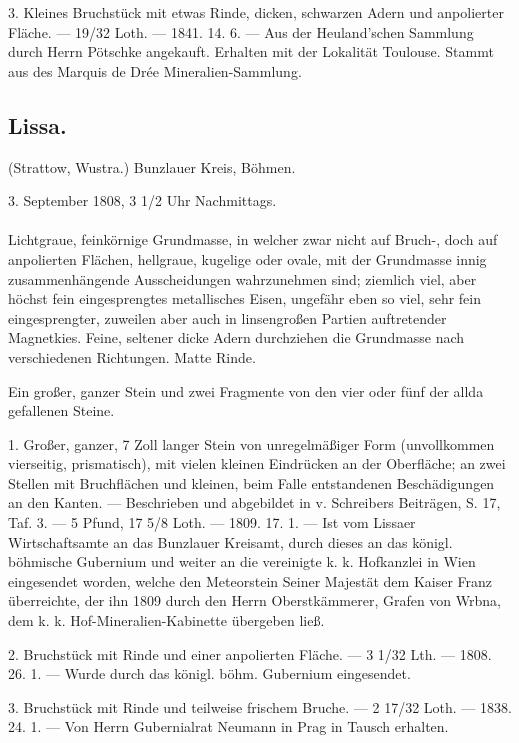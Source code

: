 \documentclass[a4paper, 11pt, oneside, polutonikogreek, german]{article}
\begin{document}
3. Kleines Bruchstück mit etwas Rinde, dicken, schwarzen Adern und anpolierter Fläche. — 19/32 Loth. — 1841. 14. 6. — Aus der Heuland'schen Sammlung durch Herrn Pötschke angekauft. Erhalten mit der Lokalität Toulouse. Stammt aus des Marquis de Drée Mineralien-Sammlung.
\subsection{Lissa.}
\begin{center}
\small
(Strattow, Wustra.) Bunzlauer Kreis, Böhmen.

3. September 1808, 3 1/2 Uhr Nachmittags.
\end{center}
\paragraph{}
Lichtgraue, feinkörnige Grundmasse, in welcher zwar nicht auf Bruch-, doch auf anpolierten Flächen, hellgraue, kugelige oder ovale, mit der Grundmasse innig zusammenhängende Ausscheidungen wahrzunehmen sind; ziemlich viel, aber höchst fein eingesprengtes metallisches Eisen, ungefähr eben so viel, sehr fein eingesprengter, zuweilen aber auch in linsengroßen Partien auftretender Magnetkies. Feine, seltener dicke Adern durchziehen die Grundmasse nach verschiedenen Richtungen. Matte Rinde.

Ein großer, ganzer Stein und zwei Fragmente von den vier oder fünf der allda gefallenen Steine.

1. Großer, ganzer, 7 Zoll langer Stein von unregelmäßiger Form (unvollkommen vierseitig, prismatisch), mit vielen kleinen Eindrücken an der Oberfläche; an zwei Stellen mit Bruchflächen und kleinen, beim Falle entstandenen Beschädigungen an den Kanten. — Beschrieben und abgebildet in v. Schreibers Beiträgen, S. 17, Taf. 3. — 5 Pfund, 17 5/8 Loth. — 1809. 17. 1. — Ist vom Lissaer Wirtschaftsamte an das Bunzlauer Kreisamt, durch dieses an das königl. böhmische Gubernium und weiter an die vereinigte k. k. Hofkanzlei in Wien eingesendet worden, welche den Meteorstein Seiner Majestät dem Kaiser Franz überreichte, der ihn 1809 durch den Herrn Oberstkämmerer, Grafen von Wrbna, dem k. k. Hof-Mineralien-Kabinette übergeben ließ.

2. Bruchstück mit Rinde und einer anpolierten Fläche. — 3 1/32 Lth. — 1808. 26. 1. — Wurde durch das königl. böhm. Gubernium eingesendet.

3. Bruchstück mit Rinde und teilweise frischem Bruche. — 2 17/32 Loth. — 1838. 24. 1. — Von Herrn Gubernialrat Neumann in Prag in Tausch erhalten.
\end{document}
